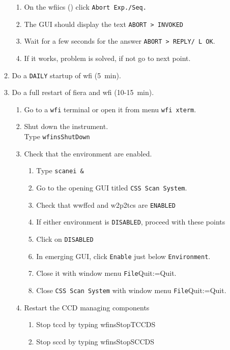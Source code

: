 \documentclass[11pt,fleqn,a4paper]{book}
\makeatletter
\def\menu#1#2{\texttt{#1}\ifx{}#2\else\@for\@x:=#2\do{$\rightarrow$\texttt{\@x}}\fi}
\def\wmenu#1#2{window menu \menu{#1}{#2}}
\makeatother
\begin{document}
\begin{enumerate}
\begin{enumerate}
\begin{enumerate}
           \item On the \gls{wfiics} () click \texttt{Abort Exp./Seq.}
           \item The GUI should display the text \texttt{ABORT    > INVOKED}
           \item Wait for a few seconds for the answer \texttt{ABORT    > REPLY/ L   OK}.
           \item If it works, problem is solved, if not go to next point.
        \end{enumerate}
      \item Do a \texttt{DAILY} startup of \gls{wfi} (5~min).
      \item\label{list:wfifierarestart} Do a full restart of \gls{fiera} and \gls{wfi} (10-15~min).
        \begin{enumerate}
          \item Go to a \texttt{wfi} terminal or open it from menu \texttt{wfi xterm}.
          \item Shut down the instrument.\\
                Type \texttt{wfinsShutDown}
          \item Check that the \gls{environment} are enabled.
             \begin{enumerate}
               \item Type \texttt{scanei \&} 
               \item Go to the opening GUI titled \texttt{CSS Scan System}.
               \item Check that \gls{wwffcd} and \gls{w2p2tcs} are \texttt{ENABLED}
               \item If either environment is \texttt{DISABLED}, proceed with these points
               \item Click on \texttt{DISABLED}
               \item In emerging GUI, click \texttt{Enable} just below \texttt{Environment}.
               \item Close it with \wmenu{File}{Quit}.
               \item Close \texttt{CSS Scan System} with \wmenu{File}{Quit}.
            \end{enumerate} 
          \item Restart the CCD managing components
             \begin{enumerate} 
               \item Stop \acrlong{tccd} by typing \gls{wfinsStopTCCDS}
               \item Stop \acrlong{sccd} by typing \gls{wfinsStopSCCDS}

\end{enumerate}
\end{enumerate}
\end{enumerate}
\end{enumerate}
\end{document}
